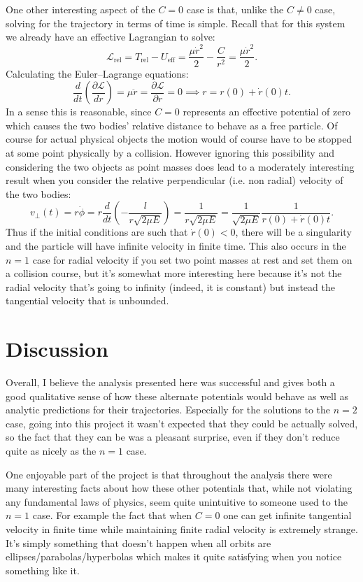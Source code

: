 \documentclass[letterpaper, reqno,11pt]{article}
\begin{document}
One other interesting aspect of the $C=0$ case is that, unlike the $C\neq 0$ case, solving for the trajectory in terms of time is simple. Recall that for this system we already have an effective Lagrangian to solve: 
\[
\mathcal L_{\text{rel}}=T_{\text{rel}}-U_{\text{eff}}=\frac{\mu \dot r^2}{2}-\frac{C}{r^2}=\frac{\mu \dot r^2}{2}
.\]
Calculating the Euler--Lagrange equations: 
\[
\frac{d}{dt}\left( \frac{\partial \mathcal L}{dr} \right)= \mu \ddot r=\frac{\partial\mathcal L}{\partial r}=0\implies r=r(0)+\dot r(0)t
.\]
In a sense this is reasonable, since $C=0$ represents an effective potential of zero which causes the two bodies' relative distance to behave as a free particle. Of course for actual physical objects the motion would of course have to be stopped at some point physically by a collision. However ignoring this possibility and considering the two objects as point masses does lead to a moderately interesting result when you consider the relative perpendicular (i.e. non radial) velocity of the two bodies: 
\[
v_{\perp}(t)=r\dot\phi=r \frac{d}{dt}\left( -\frac{l}{r\sqrt{2\mu E} } \right)=\frac{1}{r\sqrt{2\mu E} }=\frac{1}{\sqrt{2\mu E} } \frac{1}{r(0)+\dot r(0)t}
.\]
Thus if the initial conditions are such that $\dot r(0)<0$, there will be a singularity and the particle will have infinite velocity in finite time. This also occurs in the $n=1$ case for radial velocity if you set two point masses at rest and set them on a collision course, but it's somewhat more interesting here because it's not the radial velocity that's going to infinity (indeed, it is constant) but instead the tangential velocity that is unbounded. 

\section{Discussion}

Overall, I believe the analysis presented here was successful and gives both a good qualitative sense of how these alternate potentials would behave as well as analytic predictions for their trajectories. Especially for the solutions to the $n=2$ case, going into this project it wasn't expected that they could be actually solved, so the fact that they can be was a pleasant surprise, even if they don't reduce quite as nicely as the $n=1$ case. 

One enjoyable part of the project is that throughout the analysis there were many interesting facts about how these other potentials that, while not violating any fundamental laws of physics, seem quite unintuitive to someone used to the $n=1$ case. For example the fact that when $C=0$ one can get infinite tangential velocity in finite time while maintaining finite radial velocity is extremely strange. It's simply something that doesn't happen when all orbits are ellipses/parabolas/hyperbolas which makes it quite satisfying when you notice something like it. 
\end{document}

